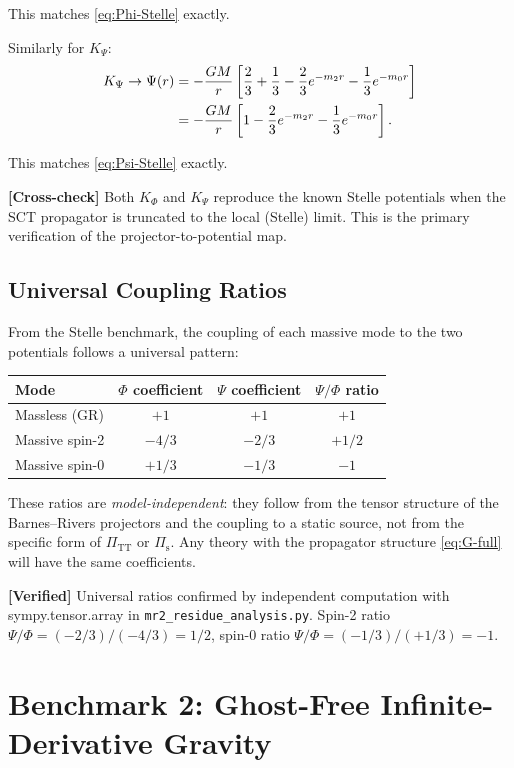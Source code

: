 \documentclass[11pt,a4paper]{article}
\theoremstyle{plain}
\theoremstyle{definition}
\theoremstyle{remark}
\newcommand{\verified}[1]{%
  \par\smallskip\noindent
  \colorbox{green!10}{\parbox{\dimexpr\linewidth-2\fboxsep}{%
    \textcolor{green!50!black}{\textbf{[Verified]}} #1}}%
  \par\smallskip}
\newcommand{\crosscheck}[1]{%
  \par\smallskip\noindent
  \colorbox{blue!10}{\parbox{\dimexpr\linewidth-2\fboxsep}{%
    \textcolor{blue!50!black}{\textbf{[Cross-check]}} #1}}%
  \par\smallskip}
\begin{document}
This matches \cref{eq:Phi-Stelle} exactly.

Similarly for $K_\Psi$:
\begin{align}
  K_\Psi \to \Psi(r)
  &= -\frac{GM}{r}\left[\frac{2}{3} + \frac{1}{3}
    - \frac{2}{3}e^{-m_2 r} - \frac{1}{3}e^{-m_0 r}\right]\notag\\
  &= -\frac{GM}{r}\left[1 - \frac{2}{3}e^{-m_2 r}
    - \frac{1}{3}e^{-m_0 r}\right].
\end{align}

This matches \cref{eq:Psi-Stelle} exactly.

\crosscheck{Both $K_\Phi$ and $K_\Psi$ reproduce the known Stelle
potentials when the SCT propagator is truncated to the local
(Stelle) limit.  This is the primary verification of the
projector-to-potential map.}

\subsection{Universal Coupling Ratios}

From the Stelle benchmark, the coupling of each massive mode to the
two potentials follows a universal pattern:

\begin{center}
\begin{tabular}{lccc}
\toprule
Mode & $\Phi$ coefficient & $\Psi$ coefficient & $\Psi/\Phi$ ratio \\
\midrule
Massless (GR) & $+1$ & $+1$ & $+1$ \\
Massive spin-2 & $-4/3$ & $-2/3$ & $+1/2$ \\
Massive spin-0 & $+1/3$ & $-1/3$ & $-1$ \\
\bottomrule
\end{tabular}
\end{center}

These ratios are \emph{model-independent}: they follow from the tensor
structure of the Barnes--Rivers projectors and the coupling to a
static source, not from the specific form of $\Pi_{\mathrm{TT}}$
or $\Pi_{\mathrm{s}}$.  Any theory with the propagator structure
\cref{eq:G-full} will have the same coefficients.

\verified{Universal ratios confirmed by independent computation
with sympy.tensor.array in \texttt{mr2\_residue\_analysis.py}.
Spin-2 ratio $\Psi/\Phi = (-2/3)/(-4/3) = 1/2$, spin-0 ratio
$\Psi/\Phi = (-1/3)/(+1/3) = -1$.}

\section{Benchmark 2: Ghost-Free Infinite-Derivative Gravity}
\label{sec:idg}
\end{document}
